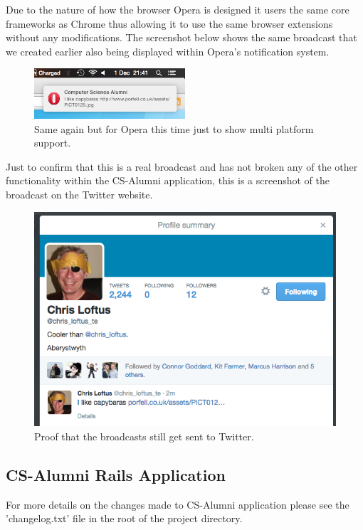 \documentclass{article}
\begin{document}
Due to the nature of how the browser Opera is designed it users the same core frameworks as Chrome thus allowing it to use the same browser extensions without any modifications. The screenshot below shows the same broadcast that we created earlier also being displayed within Opera's notification system.

\begin{figure}[H]
\centering
\includegraphics[width=0.5\textwidth]{operanotification}
\caption{Same again but for Opera this time just to show multi platform support.}
\end{figure}

\newpage
Just to confirm that this is a real broadcast and has not broken any of the other functionality within the CS-Alumni application, this is a screenshot of the broadcast on the Twitter website.

\begin{figure}[H]
\centering
\includegraphics[width=\textwidth]{twitterbc}
\caption{Proof that the broadcasts still get sent to Twitter.}
\end{figure}

\subsection{CS-Alumni Rails Application}

For more details on the changes made to CS-Alumni application please see the 'changelog.txt' file in the root of the project directory.
\end{document}
